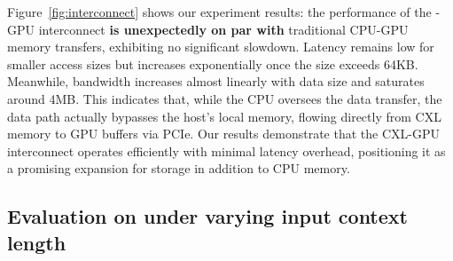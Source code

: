 Figure~\ref{fig:interconnect} shows our experiment results: the performance of the \cxl-GPU interconnect \textbf{is unexpectedly on par with} traditional CPU-GPU memory transfers, exhibiting no significant slowdown. 
Latency remains low for smaller access sizes but increases exponentially once the size exceeds 64KB. 
Meanwhile, bandwidth increases almost linearly with data size and saturates around 4MB. 
This indicates that, while the CPU oversees the data transfer, the data path actually bypasses the host's local memory, flowing directly from CXL memory to GPU buffers via PCIe.
Our results demonstrate that the CXL-GPU interconnect operates efficiently with minimal latency overhead, positioning it as a promising expansion for \kvcache storage in addition to CPU memory.

\subsection{Evaluation on \ttft under varying input context length}
\label{sec:eval:ttft}

